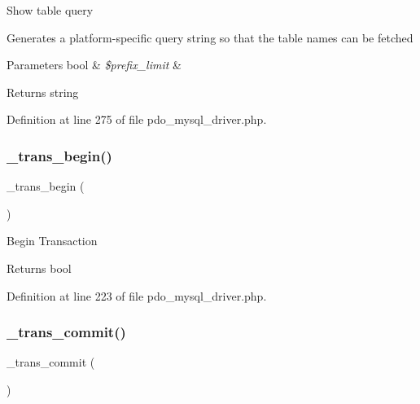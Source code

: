 Show table query

Generates a platform-\/specific query string so that the table names can be fetched


\begin{DoxyParams}[1]{Parameters}
bool & {\em \$prefix\+\_\+limit} & \\
\hline
\end{DoxyParams}
\begin{DoxyReturn}{Returns}
string 
\end{DoxyReturn}


Definition at line 275 of file pdo\+\_\+mysql\+\_\+driver.\+php.

\mbox{\label{class_c_i___d_b__pdo__mysql__driver_ac81ac882c1d54347d810199a15856aac}} 
\subsubsection{\texorpdfstring{\_trans\_begin()}{\_trans\_begin()}}
{\footnotesize\ttfamily \+\_\+trans\+\_\+begin (\begin{DoxyParamCaption}{ }\end{DoxyParamCaption})\hspace{0.3cm}{\ttfamily [protected]}}

Begin Transaction

\begin{DoxyReturn}{Returns}
bool 
\end{DoxyReturn}


Definition at line 223 of file pdo\+\_\+mysql\+\_\+driver.\+php.

\mbox{\label{class_c_i___d_b__pdo__mysql__driver_a6fe7f373e0b11cfae23a5f41c0b35dda}} 
\subsubsection{\texorpdfstring{\_trans\_commit()}{\_trans\_commit()}}
{\footnotesize\ttfamily \+\_\+trans\+\_\+commit (\begin{DoxyParamCaption}{ }\end{DoxyParamCaption})\hspace{0.3cm}{\ttfamily [protected]}}

